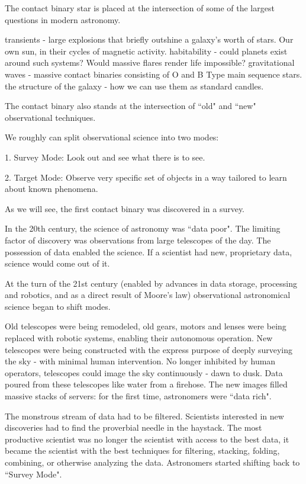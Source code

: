 \documentclass[12pt]{article} %
\numberwithin{equation}{section} %
\begin{document}
The contact binary star is placed at the intersection of some of the largest questions in modern astronomy.

transients - large explosions that briefly outshine a galaxy's worth of stars.
Our own sun, in their cycles of magnetic activity.
habitability - could planets exist around such systems? Would massive flares render life impossible?
gravitational waves - massive contact binaries consisting of O and B Type main sequence stars.
the structure of the galaxy - how we can use them as standard candles. 


The contact binary also stands at the intersection of ``old" and ``new" observational techniques. 

We roughly can split observational science into two modes:

1. Survey Mode: Look out and see what there is to see.

2. Target Mode: Observe very specific set of objects in a way tailored to learn about known phenomena.

As we will see, the first contact binary was discovered in a survey. 

In the 20th century, the science of astronomy was ``data poor". The limiting factor of discovery was observations from large telescopes of the day. The possession of data enabled the science. If a scientist had new, proprietary data, science would come out of it.

At the turn of the 21st century (enabled by advances in data storage, processing and robotics, and as a direct result of Moore's law) observational astronomical science began to shift modes.

Old telescopes were being remodeled, old gears, motors and lenses were being replaced with robotic systems, enabling their autonomous operation. New telescopes were being constructed with the express purpose of deeply surveying the sky - with minimal human intervention. No longer inhibited by human operators, telescopes could image the sky continuously - dawn to dusk. Data poured from these telescopes like water from a firehose. The new images filled massive stacks of servers: for the first time, astronomers were ``data rich". 

The monstrous stream of data had to be filtered. Scientists interested in new discoveries had to find the proverbial needle in the haystack. The most productive scientist was no longer the scientist with access to the best data, it became the scientist with the best techniques for filtering, stacking, folding, combining, or otherwise analyzing the data. Astronomers started shifting back to ``Survey Mode".
\end{document}
